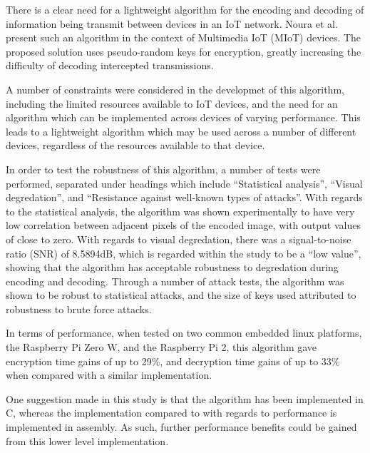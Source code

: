 There is a clear need for a lightweight algorithm for the encoding and decoding
of information being transmit between devices in an IoT network. Noura et al.
present such an algorithm in the context of Multimedia IoT (MIoT) devices. The
proposed solution uses pseudo-random keys for encryption, greatly increasing the
difficulty of decoding intercepted transmissions\cite{iotalgorithm}.

A number of constraints were considered in the developmet of this algorithm,
including the limited resources available to IoT devices, and the need for an
algorithm which can be implemented across devices of varying performance. This
leads to a lightweight algorithm which may be used across a number of different
devices, regardless of the resources available to that device.

In order to test the robustness of this algorithm, a number of tests were
performed, separated under headings which include ``Statistical analysis'', ``Visual
degredation'', and ``Resistance against well-known types of attacks''. With
regards to the statistical analysis, the algorithm was shown experimentally to
have very low correlation between adjacent pixels of the encoded image, with
output values of close to zero. With regards to visual degredation, there was a
signal-to-noise ratio (SNR) of 8.5894dB, which is regarded within the study to
be a ``low value'', showing that the algorithm has acceptable robustness to
degredation during encoding and decoding. Through a number of attack tests, the
algorithm was shown to be robust to statistical attacks, and the size of keys
used attributed to robustness to brute force attacks.

In terms of performance, when tested on two common embedded linux platforms, the
Raspberry Pi Zero W, and the Raspberry Pi 2, this algorithm gave encryption time
gains of up to 29\%, and decryption time gains of up to 33\% when compared with
a similar implementation.

One suggestion made in this study is that the algorithm has been implemented in
C, whereas the implementation compared to with regards to performance is
implemented in assembly. As such, further performance benefits could be gained
from this lower level implementation.
